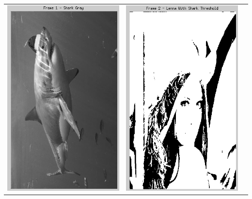 \documentclass[12pt]{article}
\begin{document}
    \begin{table}[h!]
\begin{center}
\begin{tabular} {c c c}
  \includegraphics[scale=.5]{Images/DelayedThreshold/frame1.png}
&
  \includegraphics[scale=.5]{Images/DelayedThreshold/frame2.png}

\end{tabular}
\end{center}
\end{table}
\end{document}
